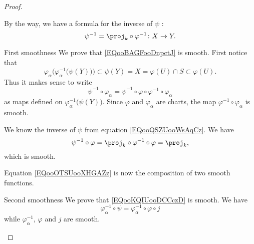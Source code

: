 \begin{proof}
\begin{subproof}
            By the way, we have a formula for the inverse of \( \psi\) :
            \begin{equation}        \label{EQooQSZUooWsAqCz}
                \psi^{-1}=\proj_k\circ\varphi^{-1}\colon X\to Y.
            \end{equation}
        \item[First smoothness]
            We prove that \eqref{EQooBAGFooDnpctJ} is smooth. First notice that
            \begin{equation}
                \varphi_{\alpha}\Big( \varphi_{\alpha}^{-1}\big( \psi(Y) \big) \Big)\subset\psi(Y)=X=\varphi(U)\cap S\subset \varphi(U).
            \end{equation}
            Thus it makes sense to write
            \begin{equation}        \label{EQooOTSUooXHGAZz}
                \psi^{-1}\circ\varphi_{\alpha}=\psi^{-1}\circ\varphi\circ\varphi^{-1}\circ\varphi_{\alpha}
            \end{equation}
            as maps defined on \( \varphi_{\alpha}^{-1}\big( \psi(Y) \big)\). Since \( \varphi\) and \( \varphi_{\alpha}\) are charts, the map \( \varphi^{-1}\circ\varphi_{\alpha}\) is smooth.

            We know the inverse of \( \psi\) from equation \eqref{EQooQSZUooWsAqCz}. We have
            \begin{equation}
                \psi^{-1}\circ\varphi=\proj_k\circ\varphi^{-1}\circ\varphi=\proj_k,
            \end{equation}
            which is smooth.

            Equation \eqref{EQooOTSUooXHGAZz} is now the composition of two smooth functions.
        \item[Second smoothness]
            We prove that \eqref{EQooKQIUooDCCczD} is smooth. We have
            \begin{equation}
                \varphi_{\alpha}^{-1}\circ\psi=\varphi_{\alpha}^{-1}\circ\varphi\circ j
            \end{equation}
            while \( \varphi_{\alpha}^{-1}\), \( \varphi\) and \( j\) are smooth.
    \end{subproof}
\end{proof}

